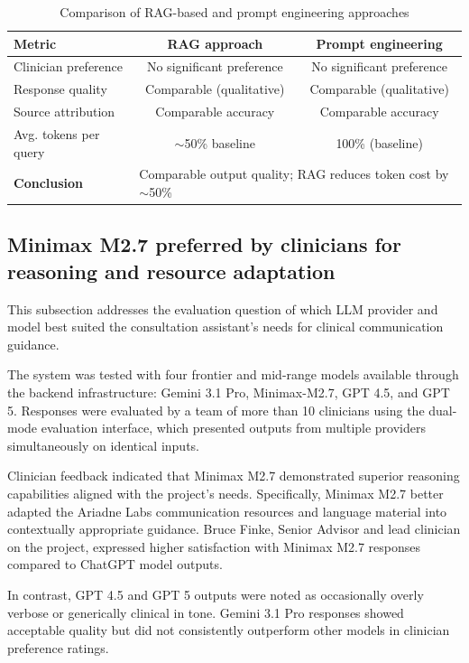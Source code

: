 \begin{table}[h]
\centering
\caption{Comparison of RAG-based and prompt engineering approaches}
\label{tab:rag_comparison}
\begin{tabular}{lcc}
\toprule
Metric & RAG approach & Prompt engineering \\
\midrule
Clinician preference & No significant preference & No significant preference \\
Response quality & Comparable (qualitative) & Comparable (qualitative) \\
Source attribution & Comparable accuracy & Comparable accuracy \\
Avg. tokens per query & $\sim$50\% baseline & 100\% (baseline) \\
\midrule
\textbf{Conclusion} & \multicolumn{2}{l}{Comparable output quality; RAG reduces token cost by $\sim$50\%} \\ 
\bottomrule
\end{tabular}
\end{table}

\subsection{Minimax M2.7 preferred by clinicians for reasoning and resource adaptation}

This subsection addresses the evaluation question of which LLM provider and model best suited the consultation assistant's needs for clinical communication guidance.

The system was tested with four frontier and mid-range models available through the backend infrastructure: Gemini 3.1 Pro, Minimax-M2.7, GPT 4.5, and GPT 5. Responses were evaluated by a team of more than 10 clinicians using the dual-mode evaluation interface, which presented outputs from multiple providers simultaneously on identical inputs.

Clinician feedback indicated that Minimax M2.7 demonstrated superior reasoning capabilities aligned with the project's needs. Specifically, Minimax M2.7 better adapted the Ariadne Labs communication resources and language material into contextually appropriate guidance. Bruce Finke, Senior Advisor and lead clinician on the project, expressed higher satisfaction with Minimax M2.7 responses compared to ChatGPT model outputs.

In contrast, GPT 4.5 and GPT 5 outputs were noted as occasionally overly verbose or generically clinical in tone. Gemini 3.1 Pro responses showed acceptable quality but did not consistently outperform other models in clinician preference ratings.

